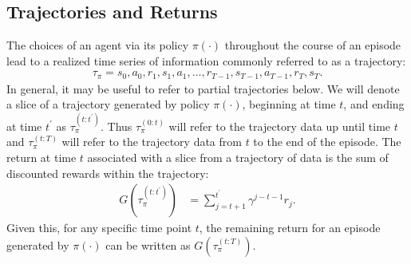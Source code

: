 \documentclass[conference]{IEEEtran}
\begin{document}
\subsection{Trajectories and Returns}
\noindent The choices of an agent via its policy $\pi(\cdot)$ throughout the course of an episode lead to a realized time series of information commonly referred to as a trajectory:
\begin{align*}
\tau_{\pi} = s_0,a_0,r_1,s_1,a_1,\hdots,r_{T-1},s_{T-1},a_{T-1},r_T,s_T.
\end{align*}
In general, it may be useful to refer to partial trajectories below.  We will denote a slice of a trajectory generated by policy $\pi(\cdot)$, beginning at time $t$, and ending at time $t^{\prime}$ as $\tau_{\pi}^{(t:t^{\prime})}$.  Thus $\tau_{\pi}^{(0:t)}$ will refer to the trajectory data up until time $t$ and $\tau_{\pi}^{(t:T)}$ will refer to the trajectory data from $t$ to the end of the episode. The return at time $t$ associated with a slice from a trajectory of data is the sum of discounted rewards within the trajectory:
\begin{align*}
G(\tau_{\pi}^{(t:t^{\prime})}) &= \sum_{j=t+1}^{t^{\prime}}\gamma^{j-t-1}r_{j}.
\end{align*}
Given this, for any specific time point $t$, the remaining return for an episode generated by $\pi(\cdot)$ can be written as $G(\tau_{\pi}^{(t:T)})$.

\end{document}

